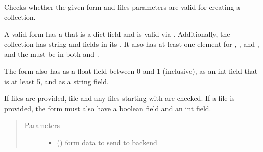 \documentclass[letterpaper,10pt,english]{sphinxmanual}
\begin{document}

\begin{fulllineitems}
\label{\detokenize{autoapi/pine/client/models/index:pine.client.models.is_valid_collection}}
Checks whether the given form and files parameters are valid for creating a collection.

A valid form has a  that is a dict field and is valid via
{\hyperref[\detokenize{autoapi/pine/client/models/index:pine.client.models.is_valid_eve_collection}]{}}.  Additionally, the collection has string  and
 fields in its .  It also has at least one element for ,
, and , and the  must be in both  and
.

The form also has  as a float field between 0 and 1 (inclusive),  as
an int field that is at least 5, and  as a string field.

If files are provided, file  and any files starting with  are checked.
If a file  is provided, the form must also have a boolean  field and an
int  field.
\begin{quote}\begin{description}
\item[{Parameters}] \leavevmode\begin{itemize}
\item {} 
 () \textendash{} form data to send to backend


\end{itemize}
\end{description}
\end{quote}
\end{fulllineitems}
\end{document}
